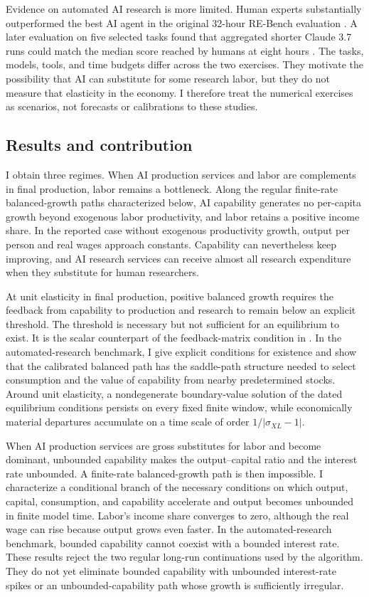 Evidence on automated AI research is more limited. Human experts substantially
outperformed the best AI agent in the original 32-hour RE-Bench evaluation
\citep{metrrebench2024}. A later evaluation on five selected tasks found that
aggregated shorter Claude 3.7 runs could match the median score reached by humans
at eight hours \citep{metrclaude2025}. The tasks, models, tools, and time budgets
differ across the two exercises. They motivate the possibility that AI can
substitute for some research labor, but they do not measure that elasticity in
the economy. I therefore treat the numerical exercises as scenarios, not
forecasts or calibrations to these studies.

\subsection{Results and contribution}

I obtain three regimes. When AI production services and labor are complements in final
production, labor remains a bottleneck. Along the regular finite-rate
balanced-growth paths characterized below, AI capability generates no per-capita
growth beyond exogenous labor productivity, and labor retains a positive income
share. In the reported case without exogenous productivity growth, output per
person and real wages approach constants. Capability can
nevertheless keep improving, and AI research services can receive almost all
research expenditure when they substitute for human researchers.

At unit elasticity in final production, positive balanced growth requires the
feedback from capability to production and research to remain below an explicit
threshold. The threshold is necessary but not sufficient for an equilibrium to
exist. It is the scalar counterpart of the feedback-matrix condition in
\citet{davidsonetal2026}. In the automated-research benchmark, I give explicit
conditions for existence and show that the calibrated balanced path has the
saddle-path structure needed to select consumption and the value of capability
from nearby predetermined stocks. Around unit elasticity, a nondegenerate
boundary-value solution of the dated equilibrium conditions persists on every
fixed finite window, while economically material departures accumulate on a time scale of order
\(1/|\sigma_{XL}-1|\).

When AI production services are gross substitutes for labor and become dominant, unbounded
capability makes the output--capital ratio and the interest rate unbounded. A
finite-rate balanced-growth path is then impossible. I characterize a
conditional branch of the necessary conditions on which output, capital,
consumption, and capability accelerate and output becomes unbounded in finite
model time. Labor's income share converges to zero, although the real wage can
rise because output grows even faster. In the automated-research benchmark,
bounded capability cannot coexist with a bounded interest rate. These results
reject the two regular long-run continuations used by the algorithm. They do
not yet eliminate bounded capability with unbounded interest-rate spikes or an
unbounded-capability path whose growth is sufficiently irregular.

